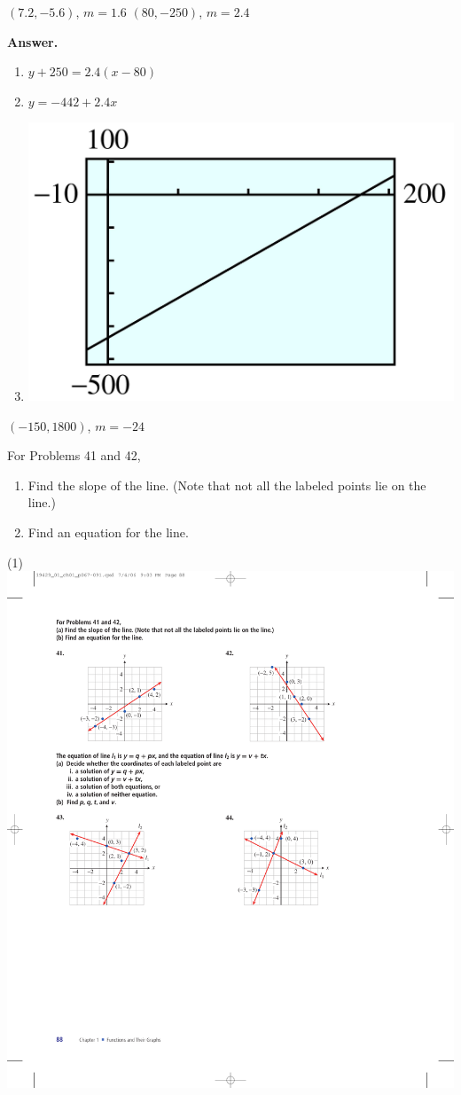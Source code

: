 \documentclass[10pt,]{book}
\theoremstyle{plain}
\theoremstyle{definition}
\theoremstyle{definition}
\theoremstyle{definition}
\theoremstyle{definition}
\numberwithin{equation}{part}
\begin{document}
\begin{exerciselist}
\begin{exercisegroup}
\begin{enumerate}[label=*\alph**]
%
\end{enumerate}
%
\exercise[38.]\hypertarget{exercise-324}{}\((7.2, -5.6)\), \(m =1.6 \)%
\exercise[39.]\hypertarget{exercise-325}{}\((80, -250)\), \(m =2.4 \)%
\par\smallskip
\noindent\textbf{Answer.}\hypertarget{answer-183}{}\quad
\leavevmode%
\begin{enumerate}[label=*\alph**]
\item\hypertarget{li-1224}{}\(y + 250 = 2.4(x - 80)\)%
\item\hypertarget{li-1225}{}\(y = -442 + 2.4x\)%
\item\hypertarget{li-1226}{}\includegraphics[width=0.4\linewidth]{images/fig-ans-1-5-39.jpg}
%
\end{enumerate}
%
\exercise[40.]\hypertarget{exercise-326}{}\((-150, 1800)\), \(m =-24 \)%
\end{exercisegroup}
\par\smallskip\noindent
\hypertarget{exercisegroup-41}{}\par\noindent For Problems 41 and 42, \leavevmode%
\begin{enumerate}[label=*\alph**]
\item\hypertarget{li-1227}{}Find the slope of the line. (Note that not all the labeled points lie on the line.)%
\item\hypertarget{li-1228}{}Find an equation for the line.%
\end{enumerate}
%
\begin{exercisegroup}(1)
\exercise[41.]\hypertarget{exercise-327}{}\includegraphics[width=0.5\linewidth]{images/fig-ex-1-5-41}

\end{exercisegroup}
\end{exerciselist}
\end{document}
